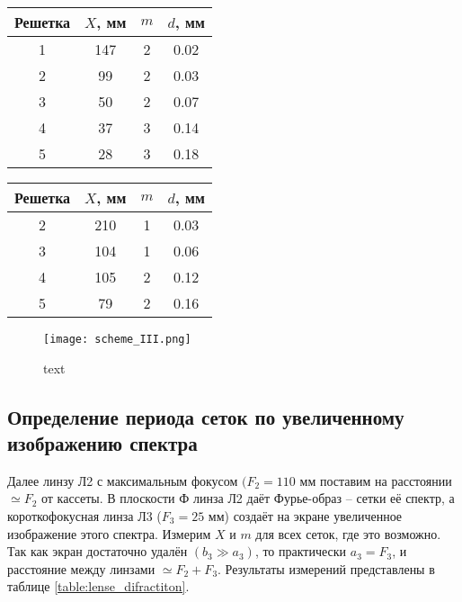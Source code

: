 	\begin{minipage}{0.4\textwidth}
		\centering
		\begin{tabular}{|c|c|c|c|}
			\hline
			Решетка    & $X$, мм  & $m$ & $d$, мм \\ \hline
			1          & 147      & 2   & 0.02    \\ \hline
			2          & 99       & 2   & 0.03    \\ \hline
			3          & 50       & 2   & 0.07    \\ \hline
			4          & 37       & 3   & 0.14    \\ \hline
			5          & 28       & 3   & 0.18    \\ \hline
		\end{tabular}
		\label{table:difraction}
	\end{minipage}
	\begin{minipage}{0.4\textwidth}
		\centering
		\begin{tabular}{|c|c|c|c|}
			\hline
			Решетка    & $X$, мм   & $m$ & $d$, мм \\ \hline
			2          & 210       & 1   & 0.03    \\ \hline
			3          & 104       & 1   & 0.06    \\ \hline
			4          & 105       & 2   & 0.12    \\ \hline
			5          & 79        & 2   & 0.16    \\ \hline
		\end{tabular}
		\label{table:lense_difractiton}
	\end{minipage}
    
    \begin{figure}
    	\centering
    	\texttt{[image: scheme\_III.png]}
    	\caption{text}
    \end{figure}
    
    \subsection{Определение периода сеток по увеличенному изображению спектра}
    
    Далее линзу Л2 с максимальным фокусом $(F_2 = 110$ мм поставим на расстоянии $\simeq F_{2}$ от кассеты. В плоскости Ф линза Л2 даёт Фурье-образ -- сетки её спектр, а короткофокусная линза Л3 ($F_3 = 25$ мм) создаёт на экране увеличенное изображение этого спектра.
    Измерим $X$ и $m$ для всех сеток, где это возможно. Так как экран достаточно удалён $\left(b_{3} \gg a_{3}\right)$, то практически $a_{3}=F_{3}$, и расстояние между линзами $\simeq F_{2}+F_{3}$. Результаты измерений представлены в таблице \ref{table:lense_difractiton}.

